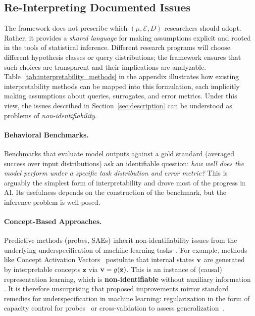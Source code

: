 \subsection{Re-Interpreting Documented Issues}
The framework does not prescribe which $(\mu, \mathcal{E}, D)$ researchers should adopt. Rather, it provides a \emph{shared language} for making assumptions explicit and rooted in the tools of statistical inference. Different research programs will choose different hypothesis classes or query distributions; the framework ensures that such choices are transparent and their implications are analyzable. Table~\ref{tab:interpretability_methods} in the appendix illustrates how existing interpretability methods can be mapped into this formulation, each implicitly making assumptions about queries, surrogates, and error metrics. Under this view, the issues described in Section~\ref{sec:description} can be understood as problems of \emph{non-identifiability}.

\paragraph{Behavioral Benchmarks.}
Benchmarks that evaluate model outputs against a gold standard (averaged success over input distributions) ask an identifiable question: \textit{how well does the model perform under a specific task distribution and error metric?} This is arguably the simplest form of interpretability and drove most of the progress in AI. Its usefulness depends on the construction of the benchmark, but the inference problem is well-posed.

\paragraph{Concept-Based Approaches.}
Predictive methods (probes, SAEs) inherit non-identifiability issues from the underlying underspecification of machine learning tasks~\citep{10.5555/3586589.3586815}.
For example, methods like Concept Activation Vectors~\citep{kim2018interpretability, cunningham2023sparseautoencodershighlyinterpretable} postulate that internal states $\mathbf{v}$ are generated by interpretable concepts $\mathbf{z}$ via $\mathbf{v} = g(\mathbf{z})$.
This is an instance of (causal) representation learning, which is \textbf{non-identifiable} without auxiliary information \citep{Locatello2019, Khemakhem2020}. 
It is therefore unsurprising that proposed improvements mirror standard remedies for underspecification in machine learning: regularization in the form of capacity control for probes~\citep{belinkov-2022-probing} or cross-validation to assess generalization~\citep{kantamneni2025sparseautoencodersusefulcase}.

